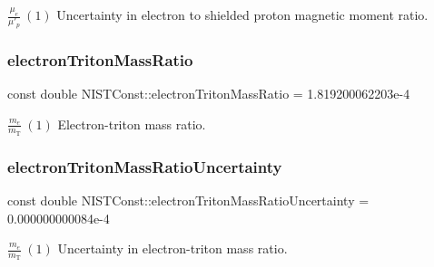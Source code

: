 $\frac{\mu_e}{\mu'_p} \ (1)$ Uncertainty in electron to shielded proton magnetic moment ratio. \mbox{\label{group___n_i_s_t_const-_electron_gac9bfee1055b6fd5d3dabb3126318b52e}} 
\subsubsection{\texorpdfstring{electron\+Triton\+Mass\+Ratio}{electronTritonMassRatio}}
{\footnotesize\ttfamily const double N\+I\+S\+T\+Const\+::electron\+Triton\+Mass\+Ratio = 1.\+819200062203e-\/4}

$\frac{m_e}{m_\textrm{T}} \ (1)$ Electron-\/triton mass ratio. \mbox{\label{group___n_i_s_t_const-_electron_ga424cccf2b6f72fd447313bac0994029e}} 
\subsubsection{\texorpdfstring{electron\+Triton\+Mass\+Ratio\+Uncertainty}{electronTritonMassRatioUncertainty}}
{\footnotesize\ttfamily const double N\+I\+S\+T\+Const\+::electron\+Triton\+Mass\+Ratio\+Uncertainty = 0.\+000000000084e-\/4}

$\frac{m_e}{m_\textrm{T}} \ (1)$ Uncertainty in electron-\/triton mass ratio. 